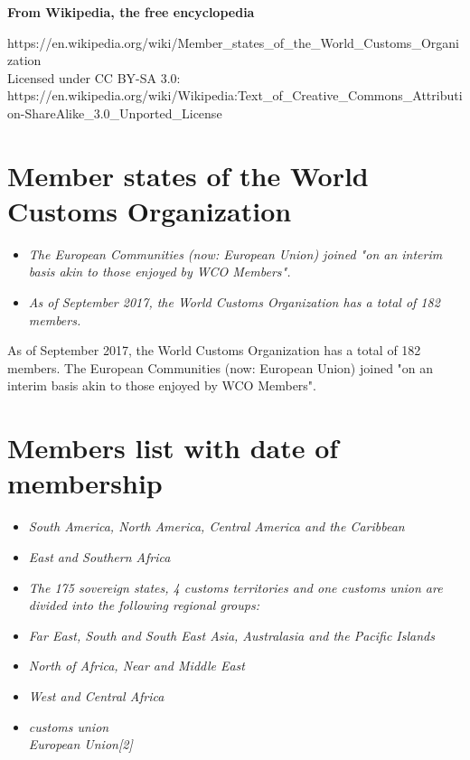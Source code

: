 \textbf{From Wikipedia, the free encyclopedia}

https://en.wikipedia.org/wiki/Member\_states\_of\_the\_World\_Customs\_Organization\\
Licensed under CC BY-SA 3.0:\\
https://en.wikipedia.org/wiki/Wikipedia:Text\_of\_Creative\_Commons\_Attribution-ShareAlike\_3.0\_Unported\_License

\section{Member states of the World Customs
Organization}\label{member-states-of-the-world-customs-organization}

\begin{itemize}
\item
  \emph{The European Communities (now: European Union) joined "on an
  interim basis akin to those enjoyed by WCO Members".}
\item
  \emph{As of September 2017, the World Customs Organization has a total
  of 182 members.}
\end{itemize}

As of September 2017, the World Customs Organization has a total of 182
members. The European Communities (now: European Union) joined "on an
interim basis akin to those enjoyed by WCO Members".

\section{Members list with date of
membership}\label{members-list-with-date-of-membership}

\begin{itemize}
\item
  \emph{South America, North America, Central America and the Caribbean}
\item
  \emph{East and Southern Africa}
\item
  \emph{The 175 sovereign states, 4 customs territories and one customs
  union are divided into the following regional groups:}
\item
  \emph{Far East, South and South East Asia, Australasia and the Pacific
  Islands}
\item
  \emph{North of Africa, Near and Middle East}
\item
  \emph{West and Central Africa}
\item
  \emph{customs union\\
  \hspace*{0.333em}European Union{[}2{]}}
\end{itemize}

